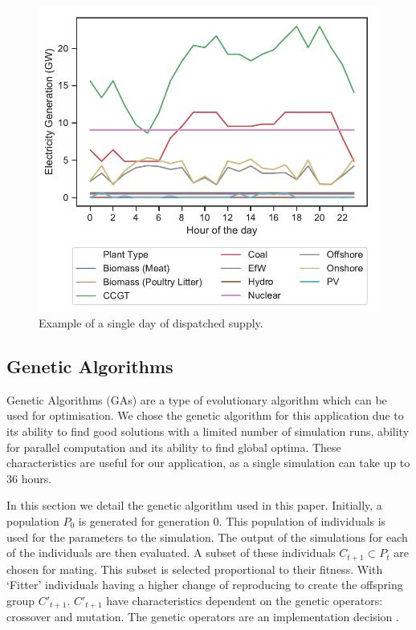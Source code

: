 \begin{figure}
	\centering
	\includegraphics[width=\textwidth]{Chapter4/figures/e-Energy-2020/methods_and_materials/clusters_results_single_day.pdf}
	\caption{Example of a single day of dispatched supply.}
	\label{fig:single_dispatched_day}
\end{figure}





\subsection{Genetic Algorithms}

Genetic Algorithms (GAs) are a type of evolutionary algorithm which can be used for optimisation. We chose the genetic algorithm for this application due to its ability to find good solutions with a limited number of simulation runs, ability for parallel computation and its ability to find global optima. These characteristics are useful for our application, as a single simulation can take up to 36 hours. 

In this section we detail the genetic algorithm used in this paper. Initially, a population $P_{0}$ is generated for generation 0. This population of individuals is used for the parameters to the simulation. The output of the simulations for each of the individuals are then evaluated. A subset of these individuals $C_{t+1} \subset P_{t}$ are chosen for mating. This subset is selected proportional to their fitness. With `Fitter' individuals having a higher change of reproducing to create the offspring group $C'_{t+1}$. $C'_{t+1}$ have characteristics dependent on the genetic operators: crossover and mutation. The genetic operators are an implementation decision \cite{FogelDavidB2009}. 

